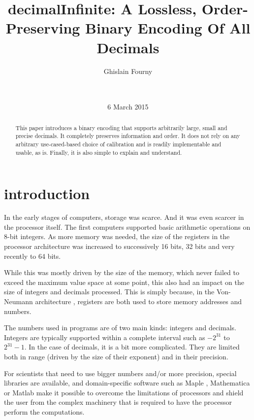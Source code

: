 \documentclass{acm_proc_article-sp}
\begin{document}
\title{decimalInfinite: A Lossless, Order-Preserving Binary Encoding Of All Decimals}


\author{
\alignauthor
Ghislain Fourny\\
       \\
       \\
}
\date{6 March 2015}
\maketitle

\begin{abstract}
This paper introduces a binary encoding that supports arbitrarily large, small and precise decimals. It completely preserves information and order. It does not rely on any arbitrary use-cased-based choice of calibration and is readily implementable and usable, as is. Finally, it is also simple to explain and understand.
\end{abstract}

\section{introduction}
In the early stages of computers, storage was scarce. And it was even scarcer in the processor itself. The first computers supported basic arithmetic operations on 8-bit integers. As more memory was needed, the size of the registers in the processor architecture was increased to successively 16 bits, 32 bits and very recently to 64 bits.

While this was mostly driven by the size of the memory, which never failed to exceed the maximum value space at some point, this also had an impact on the size of integers and decimals processed. This is simply because, in the Von-Neumann architecture \cite{VonNeumann1946}, registers are both used to store memory addresses and numbers.

The numbers used in programs are of two main kinds: integers and decimals. Integers are typically supported within a complete interval such as $- 2^{31}$ to $2^{31} -1$. In the case of decimals, it is a bit more complicated. They are limited both in range (driven by the size of their exponent) and in their precision.

For scientists that need to use bigger numbers and/or more precision, special libraries are available, and domain-specific software such as Maple \cite{MAPLE}, Mathematica \cite{MATHEMATICA} or Matlab \cite{MATLAB} make it possible to overcome the limitations of processors and shield the user from the complex machinery that is required to have the processor perform the computations.
\end{document}
